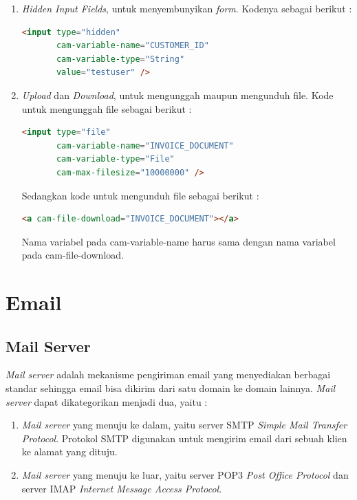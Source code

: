 \begin{enumerate}
	\item \textit{Hidden Input Fields}, untuk menyembunyikan \textit{form}. Kodenya sebagai berikut :
	\begin{lstlisting}[language=html,basicstyle=\tiny,caption=Hidden Input Fields]
	<input type="hidden"
       cam-variable-name="CUSTOMER_ID"
       cam-variable-type="String"
       value="testuser" />
	\end{lstlisting}
	
	\item \textit{Upload} dan \textit{Download}, untuk mengunggah maupun mengunduh file. Kode untuk mengunggah file sebagai berikut :
		\begin{lstlisting}[language=html,basicstyle=\tiny,caption=Upload]
	<input type="file"
       cam-variable-name="INVOICE_DOCUMENT"
       cam-variable-type="File"
       cam-max-filesize="10000000" />
	\end{lstlisting}
Sedangkan kode untuk mengunduh file sebagai berikut :
\begin{lstlisting}[language=html,basicstyle=\tiny,caption=Download]
<a cam-file-download="INVOICE_DOCUMENT"></a>
\end{lstlisting}

Nama variabel pada cam-variable-name harus sama dengan nama variabel pada cam-file-download.

	\end{enumerate}

\section{Email}
\label{email}

\subsection{Mail Server}
\label{servermail}
\textit{Mail server} adalah mekanisme pengiriman email yang menyediakan berbagai standar sehingga email bisa dikirim dari satu domain ke domain lainnya. \textit{Mail server} dapat dikategorikan menjadi dua, yaitu :
\begin{enumerate}
	\item \textit{Mail server} yang menuju ke dalam, yaitu  server SMTP \textit{Simple Mail Transfer Protocol}. Protokol SMTP digunakan untuk mengirim email dari sebuah klien ke alamat yang dituju.
	\item \textit{Mail server} yang menuju ke luar, yaitu server POP3 \textit{Post Office Protocol} dan server IMAP \textit{Internet Message Access Protocol}.

\end{enumerate}

